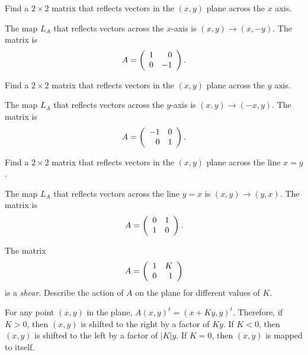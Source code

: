 \documentclass{ximera}
\begin{document}
\begin{exercise} \label{c4.2.2a}
Find a $2\times 2$ matrix that reflects vectors in the $(x,y)$ plane across
the $x$ axis.

\begin{solution}
The map $L_A$ that reflects vectors across the $x$-axis is
$(x,y) \rightarrow (x,-y)$.  The matrix is
\[
A = \left(\begin{array}{rr} 1 & 0\\ 0 &-1\end{array}\right).
\]

\end{solution}
\end{exercise}
\begin{exercise} \label{c4.2.2b}
Find a $2\times 2$ matrix that reflects vectors in the $(x,y)$ plane across
the $y$ axis.

\begin{solution}
The map $L_A$ that reflects vectors across the $y$-axis is
$(x,y) \rightarrow (-x,y)$.  The matrix is
\[
A = \left(\begin{array}{rr} -1 & 0\\ 0 &1\end{array}\right).
\]

\end{solution}
\end{exercise}
\begin{exercise} \label{c4.2.2c}
Find a $2\times 2$ matrix that reflects vectors in the $(x,y)$ plane across
the line $x=y$.

\begin{solution}
The map $L_A$ that reflects vectors across the line $y=x$ is
$(x,y) \rightarrow (y,x)$.  The matrix is
\[
A = \left(\begin{array}{rr} 0 & 1\\ 1 &0\end{array}\right).
\]

\end{solution}
\end{exercise}

\begin{exercise} \label{c7.8.1}
The matrix
\[
A=\left(\begin{array}{rr} 1 & K\\ 0 &1\end{array}\right)
\]
is a {\em shear}.  Describe the action of $A$ on the plane
for different values of $K$.

\begin{solution}

For any point $(x,y)$ in the plane, $A(x,y)^t = (x + Ky,y)^t$.  Therefore,
if $K > 0$, then $(x,y)$ is shifted to the right by a factor of $Ky$.  If
$K < 0$, then $(x,y)$ is shifted to the left by a factor of $|K|y$.  If
$K = 0$, then $(x,y)$ is mapped to itself.

\end{solution}
\end{exercise}
\end{document}
